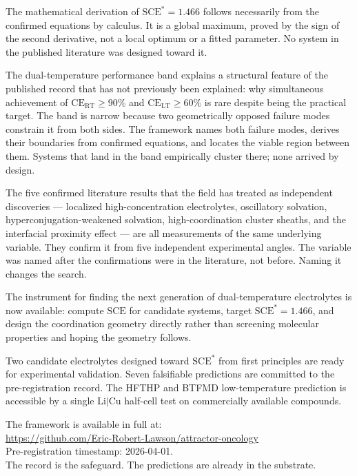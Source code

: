 \documentclass[12pt,letterpaper]{article}
\newcommand{\mSCE}{\mathrm{SCE}}
\newcommand{\mSCEstar}{\mathrm{SCE}^{*}}
\newcommand{\mCERT}{\mathrm{CE}_{\mathrm{RT}}}
\newcommand{\mCELT}{\mathrm{CE}_{\mathrm{LT}}}
\begin{document}
The mathematical derivation of $\mSCEstar = 1.466$
follows necessarily from the confirmed equations by
calculus.
It is a global maximum, proved by the sign of the
second derivative, not a local optimum or a fitted
parameter.
No system in the published literature was designed
toward it.

The dual-temperature performance band explains a
structural feature of the published record that has
not previously been explained: why simultaneous
achievement of $\mCERT \geq 90\%$ and
$\mCELT \geq 60\%$ is rare despite being the
practical target.
The band is narrow because two geometrically opposed
failure modes constrain it from both sides.
The framework names both failure modes, derives their
boundaries from confirmed equations, and locates the
viable region between them.
Systems that land in the band empirically cluster
there; none arrived by design.

The five confirmed literature results that the field
has treated as independent discoveries ---
localized high-concentration electrolytes,
oscillatory solvation, hyperconjugation-weakened
solvation, high-coordination cluster sheaths,
and the interfacial proximity effect ---
are all measurements of the same underlying variable.
They confirm it from five independent experimental
angles.
The variable was named after the confirmations were
in the literature, not before.
Naming it changes the search.

The instrument for finding the next generation of
dual-temperature electrolytes is now available:
compute $\mSCE$ for candidate systems, target
$\mSCEstar = 1.466$, and design the coordination
geometry directly rather than screening molecular
properties and hoping the geometry follows.

Two candidate electrolytes designed toward
$\mSCEstar$ from first principles are ready for
experimental validation.
Seven falsifiable predictions are committed to the
pre-registration record.
The HFTHP and BTFMD low-temperature prediction is
accessible by a single Li$|$Cu half-cell test on
commercially available compounds.

The framework is available in full at:\\
\url{https://github.com/Eric-Robert-Lawson/attractor-oncology}\\
Pre-registration timestamp: 2026-04-01.\\
The record is the safeguard.
The predictions are already in the substrate.

\end{document}
